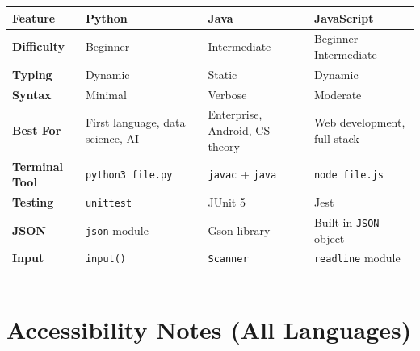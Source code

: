{\def\LTcaptype{none} %
\begin{longtable}[]{@{}
  >{\raggedright\arraybackslash}p{}
  >{\raggedright\arraybackslash}p{}
  >{\raggedright\arraybackslash}p{}
  >{\raggedright\arraybackslash}p{}@{}}
\toprule\noalign{}
\begin{minipage}[b]{\linewidth}\raggedright
Feature
\end{minipage} & \begin{minipage}[b]{\linewidth}\raggedright
Python
\end{minipage} & \begin{minipage}[b]{\linewidth}\raggedright
Java
\end{minipage} & \begin{minipage}[b]{\linewidth}\raggedright
JavaScript
\end{minipage} \\
\midrule\noalign{}
\endhead
\bottomrule\noalign{}
\endlastfoot
\textbf{Difficulty} & Beginner & Intermediate & Beginner-Intermediate \\
\textbf{Typing} & Dynamic & Static & Dynamic \\
\textbf{Syntax} & Minimal & Verbose & Moderate \\
\textbf{Best For} & First language, data science, AI & Enterprise,
Android, CS theory & Web development, full-stack \\
\textbf{Terminal Tool} & \texttt{python3\ file.py} & \texttt{javac} +
\texttt{java} & \texttt{node\ file.js} \\
\textbf{Testing} & \texttt{unittest} & JUnit 5 & Jest \\
\textbf{JSON} & \texttt{json} module & Gson library & Built-in
\texttt{JSON} object \\
\textbf{Input} & \texttt{input()} & \texttt{Scanner} & \texttt{readline}
module \\
\end{longtable}
}

\begin{center}\rule{0.5\linewidth}{0.5pt}\end{center}

\section{Accessibility Notes (All
Languages)}\label{accessibility-notes-all-languages}

